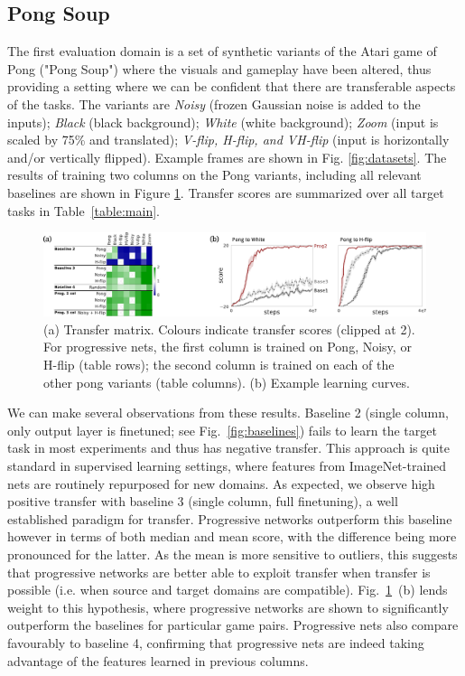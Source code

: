 \subsection{Pong Soup}
\label{sec_pong}

The first evaluation domain is a set of synthetic variants of the
Atari game of Pong ("Pong Soup") where the visuals and gameplay have been
altered, thus providing a setting where we can be confident that there
are transferable aspects of the tasks.  The variants are
\emph{Noisy} (frozen Gaussian noise is added to the inputs);
\emph{Black} (black background); \emph{White} (white
background); \emph{Zoom} (input is scaled by 75\% and
translated); \emph{V-flip, H-flip, and VH-flip} (input is
horizontally and/or vertically flipped). Example frames are shown in
Fig. \ref{fig:datasets}.
The results of training two columns on the Pong variants, including
all relevant baselines are shown in Figure
\ref{pong_results}. Transfer scores are summarized over all target
tasks in Table~\ref{table:main}.

\begin{figure}[h]
  \centering
    \includegraphics[width=1.\textwidth]{figures/transfer_pong.pdf}
    \caption{(a) Transfer matrix. Colours indicate transfer scores (clipped at 2).
      For progressive nets, the first column is trained on Pong, Noisy,
      or H-flip (table rows); the second column is trained on each of the
      other pong variants (table columns). (b) Example learning curves.}
    \label{fig:atari_results}
    \label{pong_results}
\end{figure}

We can make
several observations from these results. Baseline 2 (single column, only output layer is finetuned; see Fig.~\ref{fig:baselines})
fails to learn the target task in most
experiments and thus has negative transfer. This approach is quite standard
in supervised learning settings, where features from
ImageNet-trained nets are routinely repurposed for new domains.
As expected, we observe high positive transfer with baseline 3 (single column, full finetuning),
a well established paradigm for transfer.
Progressive networks outperform this baseline however in terms of both median and mean score, with
the difference being more pronounced for the latter. As the mean is
more sensitive to outliers, this suggests that progressive networks are better
able to exploit transfer when transfer is possible (i.e. when source and target domains are compatible). Fig.~\ref{pong_results}~(b) lends
weight to this hypothesis, where progressive networks are shown to significantly
outperform the baselines for particular game pairs.
Progressive nets also compare
favourably to baseline 4,
confirming that progressive nets are indeed taking
advantage of the features learned in previous columns.

